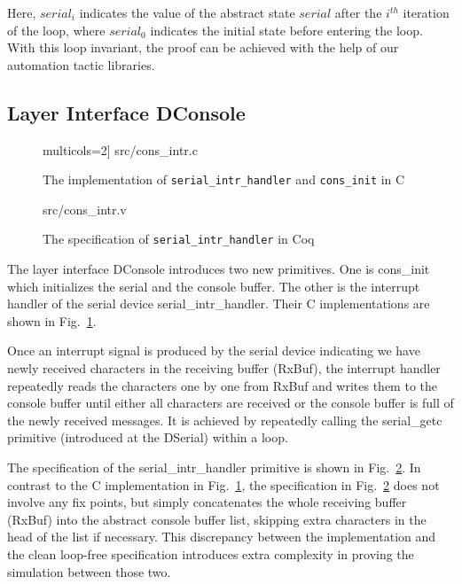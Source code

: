 Here, $serial_i$ indicates the value of the abstract state $serial$ after the
$i^{th}$ iteration of the loop, where $serial_0$ indicates the initial state
before entering the loop.
With this loop invariant, the proof can be achieved with the help of
our automation tactic libraries.




\subsection{Layer Interface DConsole}

\begin{figure}
	 multicols=2] {src/cons_intr.c}
	\caption{The implementation of \texttt{serial\_intr\_handler} and \texttt{cons\_init} in C}
	\label{fig:console_c}
\end{figure}

\begin{figure}
	 {src/cons_intr.v}
	\caption{The specification of \texttt{serial\_intr\_handler} in Coq}
	\label{fig:cons_intr_v}
\end{figure}

The layer interface DConsole introduces two new primitives. One is
\textsf{cons\_init} which initializes the serial and the console buffer. The
other is the interrupt handler of the serial device
\textsf{serial\_intr\_handler}. Their C implementations are shown in
Fig.~\ref{fig:console_c}.

Once an interrupt signal is produced by the serial device indicating we have
newly received characters in the receiving buffer (RxBuf), the interrupt handler
repeatedly reads the characters one by one from RxBuf and writes them to the
console buffer until either all characters are received or the console buffer is
full of the newly received messages. It is achieved by repeatedly calling the
\textsf{serial\_getc} primitive (introduced at the DSerial) within a loop.

The specification of the \textsf{serial\_intr\_handler} primitive is shown in
Fig.~\ref{fig:cons_intr_v}. In contrast to the C implementation in
Fig.~\ref{fig:console_c}, the specification in Fig.~\ref{fig:cons_intr_v} does
not involve any fix points, but simply concatenates the whole receiving buffer
(RxBuf) into the abstract console buffer list, skipping extra characters in the
head of the list if necessary. This discrepancy between the implementation and
the clean loop-free specification introduces extra complexity in proving the
simulation between those two.

